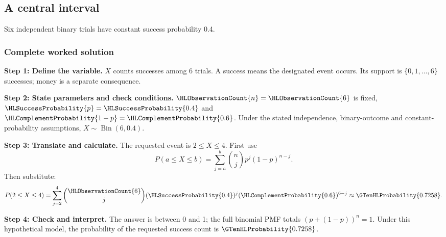 \subsection{A central interval}\label{prob:interval}
Six independent binary trials have constant success probability 0.4.


\subsubsection*{Complete worked solution}\label{sol:interval}
\par\noindent\begin{minipage}{\linewidth}
\textbf{Step 1: Define the variable.} $X$ counts successes among 6 trials. A success means the designated event occurs. Its support is $\{0,1,\ldots,6\}$ successes; money is a separate consequence.
\end{minipage}\par\medskip
\par\noindent\begin{minipage}{\linewidth}
\textbf{Step 2: State parameters and check conditions.} $\HLObservationCount{n}=\HLObservationCount{6}$ is fixed, $\HLSuccessProbability{p}=\HLSuccessProbability{0.4}$ and $\HLComplementProbability{1-p}=\HLComplementProbability{0.6}$. Under the stated independence, binary-outcome and constant-probability assumptions, $X\sim\operatorname{Bin}(6,0.4)$.
\end{minipage}\par\medskip
\par\noindent\begin{minipage}{\linewidth}
\textbf{Step 3: Translate and calculate.} The requested event is $ 2\leq X\leq4$. First use
\[P(a\leq X\leq b)=\sum_{j=a}^{b}\binom nj p^j(1-p)^{n-j}.\]
Then substitute:
\[P(2\leq X\leq4)=\sum_{j=2}^{4}\binom{\HLObservationCount{6}}j(\HLSuccessProbability{0.4})^j(\HLComplementProbability{0.6})^{6-j}\approx \GTenHLProbability{0.7258}.\]
\end{minipage}\par\medskip
\par\noindent\begin{minipage}{\linewidth}
\textbf{Step 4: Check and interpret.} The answer is between 0 and 1; the full binomial PMF totals $(p+(1-p))^n=1$. Under this hypothetical model, the probability of the requested success count is $\GTenHLProbability{0.7258}$.
\end{minipage}\par\medskip
{}
\clearpage
